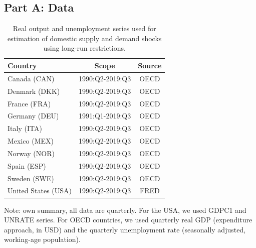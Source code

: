 \documentclass[12pt, a4paper]{article}
\begin{document}
\subsection*{Part A: Data} \label{appendix:a}
\begin{table}[H]
\captionsetup{justification=raggedright, singlelinecheck=false}
    \centering
    \caption{Real output and unemployment series used for estimation of domestic supply and demand shocks using long-run restrictions.}
    \begin{tabular}{lcc}
    \toprule
       Country & Scope & Source  \\
    \midrule
       Canada (CAN) & 1990:Q2-2019:Q3 & OECD \\
       Denmark (DKK) & 1990:Q2-2019:Q3 & OECD \\
       France (FRA) & 1990:Q2-2019:Q3 & OECD \\
       Germany (DEU) & 1991:Q1-2019:Q3 & OECD \\
       Italy (ITA) & 1990:Q2-2019:Q3 & OECD \\
       Mexico (MEX) & 1990:Q2-2019:Q3 & OECD \\
       Norway (NOR) & 1990:Q2-2019:Q3 & OECD \\
       Spain (ESP) & 1990:Q2-2019:Q3 & OECD \\
       Sweden (SWE) & 1990:Q2-2019:Q3 & OECD \\
       United States (USA) & 1990:Q2-2019:Q3 & FRED \\
    \bottomrule 
    \end{tabular}
    \begin{minipage}{\textwidth}
    \vspace{0.1cm}
    \footnotesize Note: own summary, all data are quarterly. For the USA, we used GDPC1 and UNRATE series. For OECD countries, we used quarterly real GDP (expenditure approach, in USD) and the quarterly unemployment rate (seasonally adjusted, working-age population).
    \end{minipage}
    \label{table:a1}
\end{table}


\end{document}
